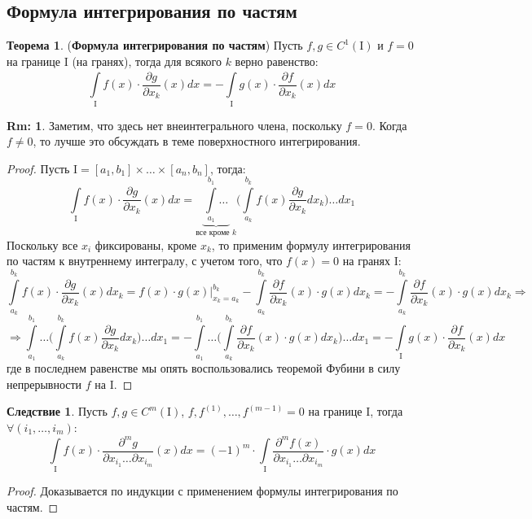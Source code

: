 \documentclass[12pt]{article}
\newcommand{\MI}{\mathrm{I}}
\theoremstyle{definition}
\newtheorem{rem}{Rm:}
\newtheorem{theorem}{Теорема}
\newtheorem{corollary}{Следствие}
\newcommand{\ddint}[2]{\displaystyle\int\limits_{#1}^{#2}}
\begin{document}
\subsection*{Формула интегрирования по частям}

\begin{theorem}(\textbf{Формула интегрирования по частям})
	Пусть $f, g \in C^1(\MI)$ и $f = 0$ на границе $\MI$ (на гранях), тогда для всякого $k$ верно равенство:
	$$
		\ddint{\MI}{}f(x){\cdot}\dfrac{\partial g}{\partial x_k}(x)dx = - \ddint{\MI}{}g(x){\cdot}\dfrac{\partial f}{\partial x_k}(x)dx
	$$
\end{theorem}
\begin{rem}
	Заметим, что здесь нет внеинтегрального члена, поскольку $f = 0$. Когда $f \neq 0$, то лучше это обсуждать в теме поверхностного интегрирования.
\end{rem}
\begin{proof}
	Пусть $\MI = [a_1,b_1]\times \dotsc \times [a_n,b_n]$, тогда:
	$$
		\ddint{\MI}{}f(x){\cdot}\dfrac{\partial g}{\partial x_k}(x)dx = \underbrace{\ddint{a_1}{b_1} \dotsc}_{\text{все кроме } k} \Bigg( \ddint{a_k}{b_k}f(x)\dfrac{\partial g}{\partial x_k}dx_k \Bigg)\dotsc dx_1
	$$
	Поскольку все $x_i$ фиксированы, кроме $x_k$, то применим формулу интегрирования по частям к внутреннему интегралу, с учетом того, что $f(x) = 0$ на гранях $\MI$:
	$$
		\ddint{a_k}{b_k}f(x){\cdot}\dfrac{\partial g}{\partial x_k}(x)dx_k =f(x){\cdot}g(x)\Big\vert_{x_k = a_k}^{b_k} - \ddint{a_k}{b_k}\dfrac{\partial f}{\partial x_k}(x){\cdot}g(x)dx_k = - \ddint{a_k}{b_k}\dfrac{\partial f}{\partial x_k}(x){\cdot}g(x)dx_k \Rightarrow
	$$
	$$
		\Rightarrow \ddint{a_1}{b_1} \dotsc \Bigg( \ddint{a_k}{b_k}f(x)\dfrac{\partial g}{\partial x_k}dx_k \Bigg)\dotsc dx_1 = -\ddint{a_1}{b_1} \dotsc \Bigg( \ddint{a_k}{b_k}\dfrac{\partial f}{\partial x_k}(x){\cdot}g(x)dx_k \Bigg)\dotsc dx_1 = - \ddint{\MI}{}g(x){\cdot}\dfrac{\partial f}{\partial x_k}(x)dx
	$$
	где в последнем равенстве мы опять воспользовались теоремой Фубини в силу непрерывности $f$ на $\MI$.
\end{proof}

\begin{corollary}
	Пусть $f,g \in C^m(\MI)$, $f,f^{(1)}, \dotsc, f^{(m-1)} = 0$ на границе $\MI$, тогда $\forall (i_1,\dotsc,i_m)$:
	$$
		\ddint{\MI}{}f(x){\cdot}\dfrac{\partial^m g}{\partial x_{i_1}\dotsc \partial x_{i_m}}(x)dx = (-1)^m{\cdot}\ddint{\MI}{}\dfrac{\partial^m f(x)}{\partial x_{i_1}\dotsc \partial x_{i_m}}{\cdot}g(x)dx
	$$
\end{corollary}
\begin{proof}
	Доказывается по индукции с применением формулы интегрирования по частям.
\end{proof}
\end{document}
